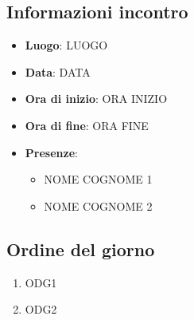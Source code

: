 \subsection{Informazioni incontro}
\begin{itemize}
\item \textbf{Luogo}: LUOGO
\item \textbf{Data}: DATA
\item \textbf{Ora di inizio}: ORA INIZIO
\item \textbf{Ora di fine}: ORA FINE
\item \textbf{Presenze}: 
	\begin{itemize}
		\item NOME COGNOME 1
		\item NOME COGNOME 2
	\end{itemize}
\end{itemize}

\subsection{Ordine del giorno}
	\begin{enumerate}
		\item ODG1
		\item ODG2
	\end{enumerate}
